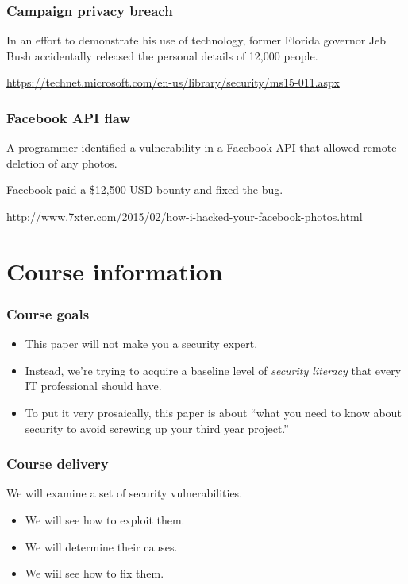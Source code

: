 \documentclass[10pt]{beamer}
\begin{document}
\begin{frame}
	\frametitle{Campaign privacy breach}

	In an effort to demonstrate his use of technology, former
	Florida governor Jeb Bush accidentally released the personal
	details of 12,000 people.

	\vspace{10mm}
	\url{https://technet.microsoft.com/en-us/library/security/ms15-011.aspx}

\end{frame}

\begin{frame}
	\frametitle{Facebook API flaw}

	A programmer identified a vulnerability in a Facebook API
	that allowed remote deletion of any photos.

	\vspace{10mm}
	Facebook paid a \$12,500 USD bounty and fixed the bug.

	\vspace{10mm}
	\url{http://www.7xter.com/2015/02/how-i-hacked-your-facebook-photos.html}
\end{frame}
\section{Course information}
\begin{frame}
  \frametitle{Course goals}

 \begin{itemize}
  \item This paper will not make you a security expert.
  \item Instead, we're trying to acquire a baseline level of \emph{security literacy}
	  that every IT professional should have.
  \item To put it very prosaically, this paper is about ``what you need to 
	  know about security to avoid screwing up your third year project.''
  \end{itemize}
\end{frame}

\begin{frame}
	\frametitle{Course delivery}
	
	We will examine a set of security vulnerabilities.
	
	\begin{itemize}
		\item We will see how to exploit them.
		\item We will determine their causes.
		\item We wiil see how to fix them.
	\end{itemize}
\end{frame}
\end{document}
